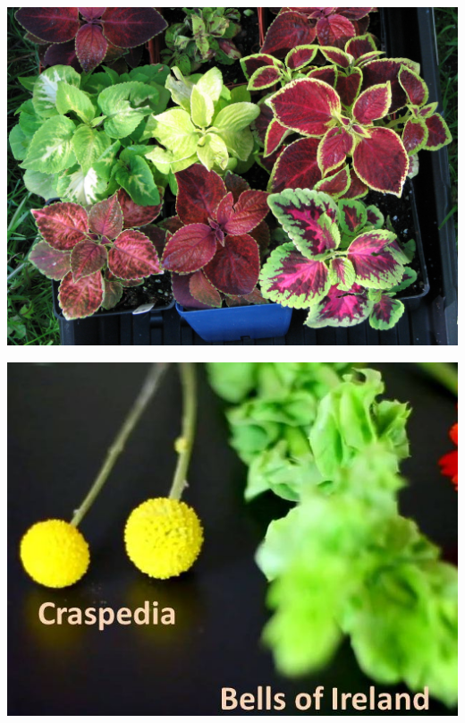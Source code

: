 \documentclass{article}
\begin{document}
\begin{center}
\includegraphics[width=0.9\textheight, angle=90]{../Coleus_hybrids.jpg}
\end{center}
\newpage

\begin{center}
\includegraphics[width=0.9\textheight, angle=90]{../Craspedia-BellsOfIreland.jpg}
\end{center}
\newpage
\end{document}
